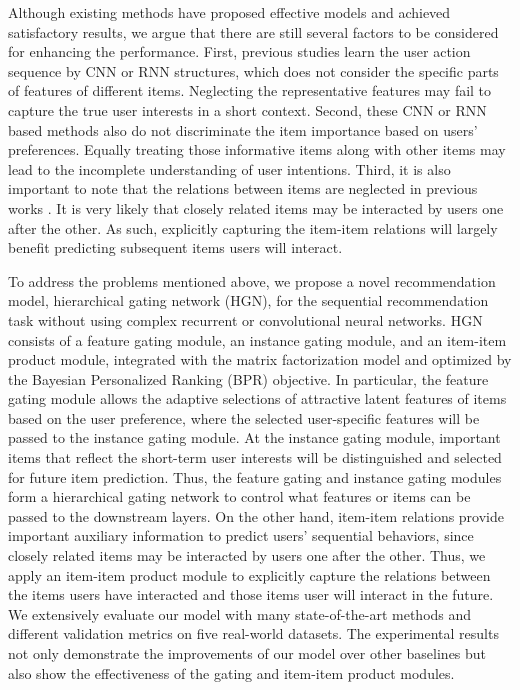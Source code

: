 \documentclass[sigconf]{acmart}
\begin{document}
Although existing methods have proposed effective models and achieved satisfactory results, we argue that there are still several factors to be considered for enhancing the performance. First, previous studies \cite{DBLP:conf/wsdm/TangW18,DBLP:journals/corr/HidasiKBT15,DBLP:conf/recsys/QuadranaKHC17,DBLP:conf/cikm/HidasiK18} learn the user action sequence by CNN or RNN structures, which does not consider the specific parts of features of different items. Neglecting the representative features may fail to capture the true user interests in a short context. Second, these CNN or RNN based methods also do not discriminate the item importance based on users' preferences. Equally treating those informative items along with other items may lead to the incomplete understanding of user intentions. Third, it is also important to note that the relations between items are neglected in previous works \cite{DBLP:conf/icdm/KangM18,DBLP:conf/cikm/HidasiK18,DBLP:conf/wsdm/TangW18}. It is very likely that closely related items may be interacted by users one after the other. As such, explicitly capturing the item-item relations will largely benefit predicting subsequent items users will interact.

To address the problems mentioned above, we propose a novel recommendation model, hierarchical gating network (HGN), for the sequential recommendation task without using complex recurrent or convolutional neural networks. HGN consists of a feature gating module, an instance gating module, and an item-item product module, integrated with the matrix factorization model and optimized by the Bayesian Personalized Ranking (BPR) objective. In particular, the feature gating module allows the adaptive selections of attractive latent features of items based on the user preference, where the selected user-specific features will be passed to the instance gating module. At the instance gating module, important items that reflect the short-term user interests will be distinguished and selected for future item prediction. Thus, the feature gating and instance gating modules form a hierarchical gating network to control what features or items can be passed to the downstream layers. On the other hand, item-item relations provide important auxiliary information to predict users' sequential behaviors, since closely related items may be interacted by users one after the other. Thus, we apply an item-item product module to explicitly capture the relations between the items users have interacted and those items user will interact in the future. We extensively evaluate our model with many state-of-the-art methods and different validation metrics on five real-world datasets. The experimental results not only demonstrate the improvements of our model over other baselines but also show the effectiveness of the gating and item-item product modules.
\end{document}
